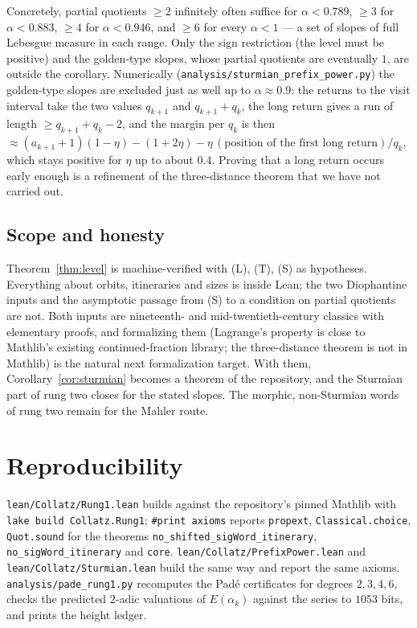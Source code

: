 \documentclass[11pt]{article}
\theoremstyle{definition}
\newcommand{\code}[1]{\texttt{#1}}
\begin{document}
Concretely, partial quotients $\ge 2$ infinitely often suffice for
$\alpha < 0.789$, $\ge 3$ for $\alpha < 0.883$, $\ge 4$ for $\alpha <
0.946$, and $\ge 6$ for every $\alpha < 1$ --- a set of slopes of full
Lebesgue measure in each range. Only the sign restriction (the level
must be positive) and the golden-type slopes, whose partial quotients
are eventually $1$, are outside the corollary. Numerically
(\code{analysis/sturmian\_prefix\_power.py}) the golden-type slopes are
excluded just as well up to $\alpha \approx 0.9$: the returns to the
visit interval take the two values $q_{k+1}$ and $q_{k+1} + q_k$, the
long return gives a run of length $\ge q_{k+1} + q_k - 2$, and the
margin per $q_k$ is then $\approx (a_{k+1} + 1)(1 - \eta) - (1 +
2\eta) - \eta\,(\text{position of the first long return})/q_k$,
which stays positive for $\eta$ up to about $0.4$. Proving that a long
return occurs early enough is a refinement of the three-distance
theorem that we have not carried out.

\subsection{Scope and honesty}

Theorem~\ref{thm:level} is machine-verified with (L), (T), (S) as
hypotheses. Everything about orbits, itineraries and sizes is inside
Lean; the two Diophantine inputs and the asymptotic passage from (S)
to a condition on partial quotients are not. Both inputs are
nineteenth- and mid-twentieth-century classics with elementary
proofs, and formalizing them (Lagrange's property is close to
Mathlib's existing continued-fraction library; the three-distance
theorem is not in Mathlib) is the natural next formalization target.
With them, Corollary~\ref{cor:sturmian} becomes a theorem of the
repository, and the Sturmian part of rung two closes for the stated
slopes. The morphic, non-Sturmian words of rung two remain for the
Mahler route.

\section*{Reproducibility}

\code{lean/Collatz/Rung1.lean} builds against the repository's pinned
Mathlib with \code{lake build Collatz.Rung1}; \code{\#print axioms}
reports \code{propext}, \code{Classical.choice}, \code{Quot.sound} for
the theorems \code{no\_shifted\_sigWord\_itinerary},
\code{no\_sigWord\_itinerary} and \code{core}. \code{lean/Collatz/PrefixPower.lean} and \code{lean/Collatz/Sturmian.lean}
build the same way and report the same axioms.
\code{analysis/pade\_rung1.py} recomputes the Pad\'e
certificates for degrees $2, 3, 4, 6$, checks the predicted $2$-adic
valuations of $E(\alpha_k)$ against the series to $1053$ bits, and
prints the height ledger.
\end{document}
